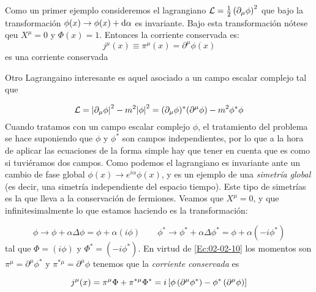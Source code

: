 \begin{ejemplo}
	Como un primer ejemplo consideremos el lagrangiano $\mathcal{L} = \frac{1}{2} \left( \partial_\mu \phi \right)^2$ que bajo la transformación $\phi(x) \rightarrow \phi (x) + \mathrm{d} \alpha$ es invariante. Bajo esta transformación nótese qeu $X^\mu=0$ y $\Phi(x)=1$. Entonces la corriente conservada es:
	\begin{equation*}
		j^\mu (x )  \equiv \pi^\mu (x) = \partial^\mu \phi(x)
	\end{equation*}
	es una corriente conservada
\end{ejemplo}
\begin{ejemplo}
	Otro Lagrangaino interesante es aquel asociado a un campo escalar complejo tal que 
	
	\begin{equation}
		\mathcal{L} = \abs{\partial_\mu \phi}^2 - m^2 \abs{\phi}^2 = (\partial_\mu \phi)^* (\partial^\mu \phi) - m^2 \phi^* \phi 
	\end{equation}
	Cuando tratamos con un campo escalar complejo $\phi$, el tratamiento del problema se hace suponiendo que $\phi$ y $\phi^*$ son campos independientes, por lo que a la hora de aplicar las ecuaciones de la forma simple hay que tener en cuenta que es como si tuviéramos dos campos. Como podemos el lagrangiano es invariante ante un cambio de fase global $\phi(x) \rightarrow e^{i\alpha} \phi(x)$, y es un ejemplo de una \textit{simetría global} (es decir, una simetría independiente del espacio tiempo). Este tipo de simetrías es la que lleva a la conservación de fermiones. Veamos que $X^\mu=0$, y que infinitesimalmente lo que estamos haciendo es la transformación:
	
	\begin{equation}
		\phi \rightarrow \phi + \alpha \Delta \phi = \phi + \alpha (i\phi) \qquad
		\phi^* \rightarrow \phi^* + \alpha \Delta \phi^*  = \phi + \alpha (-i\phi^*) 
	\end{equation}
	tal que $\Phi=(i\phi)$ y  $\Phi^*=(-i\phi^*)$. En virtud de \cref{Ec:02-02-10} los momentos son $\pi^\mu = \partial^\mu \phi^*$ y $\pi^{*\mu}=\partial^\mu \phi$ tenemos que la \textit{corriente conservada} es
	
	\begin{equation}
		j^\mu (x) = \pi^\mu \Phi + \pi^{*\mu} \Phi^* = i \left[ \phi\left( \partial^\mu \phi^* \right) - \phi^* \left( \partial^\mu \phi \right) \right]
	\end{equation} 
	 
\end{ejemplo}


